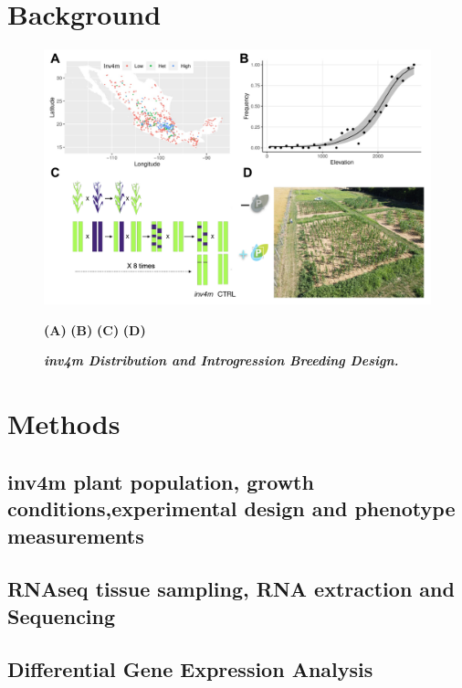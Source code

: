 \section{Background}

\begin{figure}[!ht]
\centering
\includegraphics[width=\linewidth]{Chapter-3/figs/design.png}
\caption[\textit{inv4m} Distribution and Introgression Breeding Design]{\textit{\textbf{inv4m Distribution and Introgression Breeding Design.}}}
\textbf{(A)} 
\textbf{(B)}
\textbf{(C)} 
\textbf{(D)}
\label{fig::design}
\end{figure}

\section{Methods}
\subsection*{inv4m plant population, growth conditions,experimental design and phenotype measurements}

\subsection*{RNAseq tissue sampling, RNA extraction and Sequencing}

\subsection*{Differential Gene Expression Analysis}


